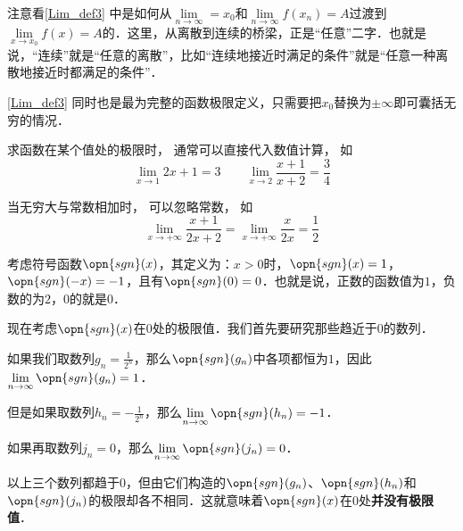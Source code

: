 注意看\autoref{Lim_def3} 中是如何从$\lim\limits_{n\to\infty}=x_0$和$\lim\limits_{n\to\infty}f(x_n)=A$过渡到$\lim\limits_{x\to x_0}f(x)=A$的．这里，从离散到连续的桥梁，正是“任意”二字．也就是说，“连续”就是“任意的离散”，比如“连续地接近时满足的条件”就是“任意一种离散地接近时都满足的条件”．

\autoref{Lim_def3} 同时也是最为完整的函数极限定义，只需要把$x_0$替换为$\pm\infty$即可囊括无穷的情况．



\begin{example}{}
求函数在某个值处的极限时， 通常可以直接代入数值计算， 如
\begin{equation}
\lim_{x\to 1} 2x + 1 = 3 \qquad \lim_{x\to 2}\frac{x + 1}{x + 2} = \frac34
\end{equation}

当无穷大与常数相加时， 可以忽略常数， 如
\begin{equation}
\lim_{x\to +\infty} \frac{x + 1}{2x + 2} = \lim_{x\to +\infty} \frac{x}{2x} = \frac12
\end{equation}
\end{example}

\begin{example}{}\label{Lim_ex2}
考虑符号函数$\opn{sgn}(x)$，其定义为：$x>0$时，$\opn{sgn}(x)=1$，$\opn{sgn}(-x)=-1$，且有$\opn{sgn}(0)=0$．也就是说，正数的函数值为$1$，负数的为$2$，$0$的就是$0$．

现在考虑$\opn{sgn}(x)$在$0$处的极限值．我们首先要研究那些趋近于$0$的数列．

如果我们取数列$g_n=\frac{1}{2^n}$，那么$\opn{sgn}(g_n)$中各项都恒为$1$，因此$\lim\limits_{n\to\infty}\opn{sgn}(g_n)=1$．

但是如果取数列$h_n=-\frac{1}{2^n}$，那么$\lim\limits_{n\to\infty}\opn{sgn}(h_n)=-1$．

如果再取数列$j_n=0$，那么$\lim\limits_{n\to\infty}\opn{sgn}(j_n)=0$．

以上三个数列都趋于$0$，但由它们构造的$\opn{sgn}(g_n)$、$\opn{sgn}(h_n)$和$\opn{sgn}(j_n)$的极限却各不相同．这就意味着$\opn{sgn}(x)$在$0$处\textbf{并没有极限值}．
\end{example}

